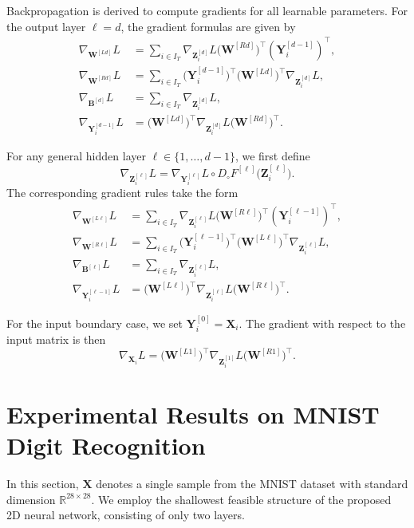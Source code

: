 \documentclass[pdflatex,sn-mathphys-num]{sn-jnl}%
\theoremstyle{thmstyleone}%
\theoremstyle{thmstyletwo}%
\theoremstyle{thmstylethree}%
\begin{document}
Backpropagation is derived to compute gradients for all learnable parameters. For the output layer $\ell=d$, the gradient formulas are given by
\begin{align*}
\nabla_{\boldsymbol{W}^{[Ld]}} L
&=
\sum_{i\in I_T}
\nabla_{\boldsymbol{Z}_i^{[d]}} L
\big(\boldsymbol{W}^{[Rd]}\big)^\top
\left(\boldsymbol{Y}_i^{[d-1]}\right)^\top,
\\
\nabla_{\boldsymbol{W}^{[Rd]}} L
&=
\sum_{i\in I_T}\big(\boldsymbol{Y}_i^{[d-1]}\big)^\top
\big(\boldsymbol{W}^{[Ld]}\big)^\top
\nabla_{\boldsymbol{Z}_i^{[d]}} L,
\\
\nabla_{\boldsymbol{B}^{[d]}} L
&=
\sum_{i\in I_T} \nabla_{\boldsymbol{Z}_i^{[d]}} L,
\\
\nabla_{\boldsymbol{Y}_i^{[d-1]}} L
&=
\big(\boldsymbol{W}^{[Ld]}\big)^\top
\nabla_{\boldsymbol{Z}_i^{[d]}} L
\big(\boldsymbol{W}^{[Rd]}\big)^\top.
\end{align*}

For any general hidden layer $\ell \in \{1,\dots,d-1\}$, we first define
\[
\nabla_{\boldsymbol{Z}_i^{[\ell]}} L
=
\nabla_{\boldsymbol{Y}_i^{[\ell]}} L
\circ
D_\circ F^{[\ell]}\big(\boldsymbol{Z}_i^{[\ell]}\big).
\]
The corresponding gradient rules take the form
\begin{align*}
\nabla_{\boldsymbol{W}^{[L\ell]}} L
&=
\sum_{i\in I_T}
\nabla_{\boldsymbol{Z}_i^{[\ell]}} L
\big(\boldsymbol{W}^{[R\ell]}\big)^\top
(\boldsymbol{Y}_i^{[\ell-1]})^\top,
\\
\nabla_{\boldsymbol{W}^{[R\ell]}} L
&=
\sum_{i\in I_T}\big(\boldsymbol{Y}_i^{[\ell-1]}\big)^\top
\big(\boldsymbol{W}^{[L\ell]}\big)^\top
\nabla_{\boldsymbol{Z}_i^{[\ell]}} L,
\\
\nabla_{\boldsymbol{B}^{[\ell]}} L
&=
\sum_{i\in I_T} \nabla_{\boldsymbol{Z}_i^{[\ell]}} L,
\\
\nabla_{\boldsymbol{Y}_i^{[\ell-1]}} L
&=
\big(\boldsymbol{W}^{[L\ell]}\big)^\top
\nabla_{\boldsymbol{Z}_i^{[\ell]}} L
\big(\boldsymbol{W}^{[R\ell]}\big)^\top.
\end{align*}

For the input boundary case, we set $\boldsymbol{Y}_i^{[0]} = \boldsymbol{X}_i$. The gradient with respect to the input matrix is then
\[
\nabla_{\boldsymbol{X}_i} L
=
\big(\boldsymbol{W}^{[L1]}\big)^\top
\nabla_{\boldsymbol{Z}_i^{[1]}} L
\big(\boldsymbol{W}^{[R1]}\big)^\top.
\]



\section{Experimental Results on MNIST Digit Recognition}\label{Experimental Results}
In this section, $\boldsymbol{X}$ denotes a single sample from the MNIST dataset with standard dimension $\mathbb{R}^{28 \times 28}$.
We employ the shallowest feasible structure of the proposed 2D neural network, consisting of only two layers.
\end{document}
